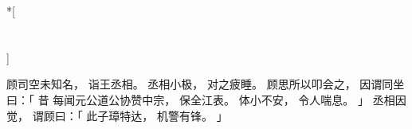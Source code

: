 
\switchcolumn[0]*[\section{}]

顾司空未知名，
诣王丞相。
丞相小极，
对之疲睡。
顾思所以叩会之，
因谓同坐曰：「
    昔
    每闻元公道公协赞中宗，
    保全江表。
    体小不安，
    令人喘息。
」
丞相因觉，
谓顾曰：「
    此子璋特达，
    机警有锋。
」

\switchcolumn



